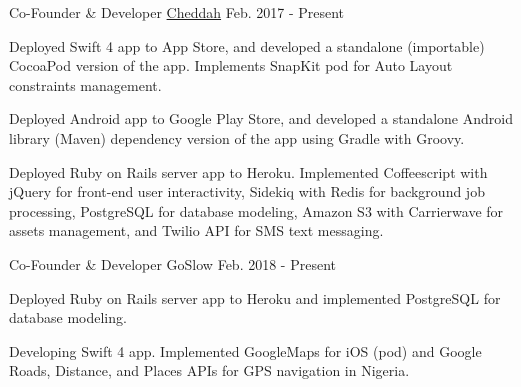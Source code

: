 \vspace{10mm}


\begin{cventries}

  \cventry
    {Co-Founder \& Developer} %
    {\href{http://cheddah.herokuapp.com/}{Cheddah}} %
    {} %
    {Feb. 2017 - Present} %
    {
      \begin{cvitems} %
        \item {Deployed Swift 4 app to App Store, and developed a standalone (importable) CocoaPod version of the app. Implements SnapKit pod for Auto Layout constraints management.}
        \item {Deployed Android app to Google Play Store, and developed a standalone Android library (Maven) dependency version of the app using Gradle with Groovy.}
        \item {Deployed Ruby on Rails server app to Heroku. Implemented Coffeescript with jQuery for front-end user interactivity, Sidekiq with Redis for background job processing, PostgreSQL for database modeling, Amazon S3 with Carrierwave for assets management, and Twilio API for SMS text messaging.}
      \end{cvitems}
    }

\vspace{5mm}
  \cventry
    {Co-Founder \& Developer} %
    {GoSlow} %
    {} %
    {Feb. 2018 - Present} %
    {
      \begin{cvitems} %
      	\item {Deployed Ruby on Rails server app to Heroku and implemented PostgreSQL for database modeling.}
        \item {Developing Swift 4 app. Implemented GoogleMaps for iOS (pod) and Google Roads, Distance, and Places APIs for GPS navigation in Nigeria.}
      \end{cvitems}
    }


\end{cventries}